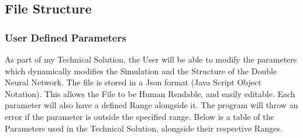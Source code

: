 \begin{flushleft}
\begin{figure}[H]
                    {
                    }
                \end{figure}
        \subsection{File Structure}
            \subsubsection{User Defined Parameters}
                As part of my Technical Solution, the User will be able to modify the parameters which dynamically modifies the Simulation
                and the Structure of the Double Neural Network. The file is stored in a Json format (Java Script Object Notation).
                This allows the File to be Human Readable, and easily editable. Each parameter will also have a defined Range alongside it.
                The program will throw an error if the parameter is outside the specified range. Below is a table of the Parameters used in
                the Technical Solution, alongside their respective Ranges. \\

                \vspace{0.5cm}


\end{flushleft}
